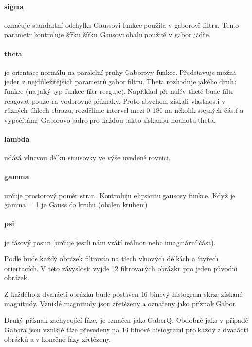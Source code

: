 \documentclass[czech,BP]{thesiskiv}
\begin{document}
\paragraph{sigma} označuje standartní odchylka Gaussovi funkce použita v gaborově filtru. Tento parametr kontroluje šířku šířku Gausovi obalu použité v gabor jádře.

\paragraph{theta} je orientace normálu na paralelní pruhy Gaborovy funkce. Představuje možná jeden z nejdůležitějších parametrů gabor filtru. Theta rozhoduje jakého druhu funkce (na jaký typ funkce filtr reaguje). Například při nulév thetě bude filtr reagovat pouze na vodorovné příznaky. Proto abychom získali vlastnosti v různých úhlech obrazu, rozdělíme interval mezi 0-180 na několik stejných částí a vypočítáme Gaborovo jádro pro každou takto získanou hodnotu theta.

\paragraph{lambda} udává vlnovou délku sinusovky ve výše uvedené rovnici.

\paragraph{gamma} určuje prostorový poměr stran. Kontroluju elipsicitu gausovy funkce. Když je gamma = 1 je Gauss do kruhu (obalen kruhem)

\paragraph{psi} je fázový posun (určuje jestli nám vrátí reálnou nebo imaginární část). \\ 

\par Podle \citep{JEC} bude každý obrázek filtrován na třech vlnových délkách a čtyřech orientacích. V této závyslosti vyjde 12 filtrovaných obrázku pro jeden původní obrázek. 

\par Z každého z dvanácti obrázků bude postaven 16 binový histogram skrze získané magnitudy. Vzniklé magnitudy jsou zřetězeny a označeny jako příznak Gabor. 

\par Druhý příznak zachycující fáze, je označen jako GaborQ. Obdobně jako v případě Gabora jsou vzniklé fáze převedeny na 16 binové histogrami pro každý z dvanácti obrázků a v konečné fázy zřetězeny.
\end{document}
